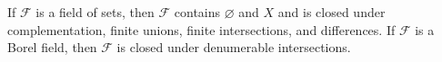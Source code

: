 If $\mathcal{F}$ is a field of sets, then $\mathcal{F}$ contains $\varnothing$ and $X$ and is closed under complementation, finite unions, finite intersections, and differences. If $\mathcal{F}$ is a Borel field, then $\mathcal{F}$ is closed under denumerable intersections.
